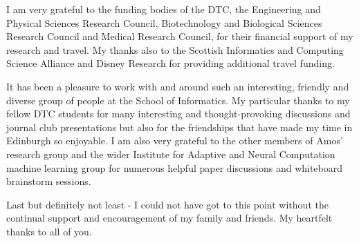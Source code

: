 I am very grateful to the funding bodies of the DTC, the Engineering and Physical Sciences Research Council, Biotechnology and Biological Sciences Research Council and Medical Research Council, for their financial support of my research and travel. My thanks also to the Scottish Informatics and Computing Science Alliance and Disney Research for providing additional travel funding.

It has been a pleasure to work with and around such an interesting, friendly and diverse group of people at the School of Informatics. My particular thanks to my fellow DTC students for many interesting and thought-provoking discussions and journal club presentations but also for the friendships that have made my time in Edinburgh so enjoyable. I am also very grateful to the other members of Amos' research group and the wider Institute for Adaptive and Neural Computation machine learning group for numerous helpful paper discussions and whiteboard brainstorm sessions.

Last but definitely not least - I could not have got to this point without the continual support and encouragement of my family and friends. My heartfelt thanks to all of you.

